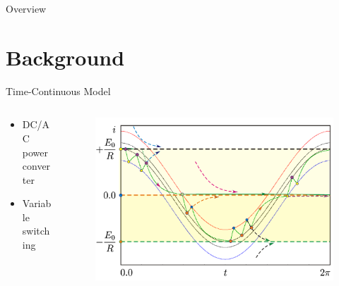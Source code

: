 
\begin{frame}{Overview}
	\tableofcontents
\end{frame}

\section{Background}

\begin{frame}{Time-Continuous Model}
	\vspace{-1em}
	\begin{columns}
		\begin{column}{.4 \textwidth}
			\begin{itemize}
				\item DC/AC power converter
				\item Variable switching
			\end{itemize}
		\end{column}
		\begin{column}{.6 \textwidth}
			\begin{figure}
				\includegraphics[width=0.8 \textwidth]{Figs/continuous_model.png}
			\end{figure}

			\flushright{[Zhusubaliyev]}
		\end{column}
	\end{columns}
\end{frame}


